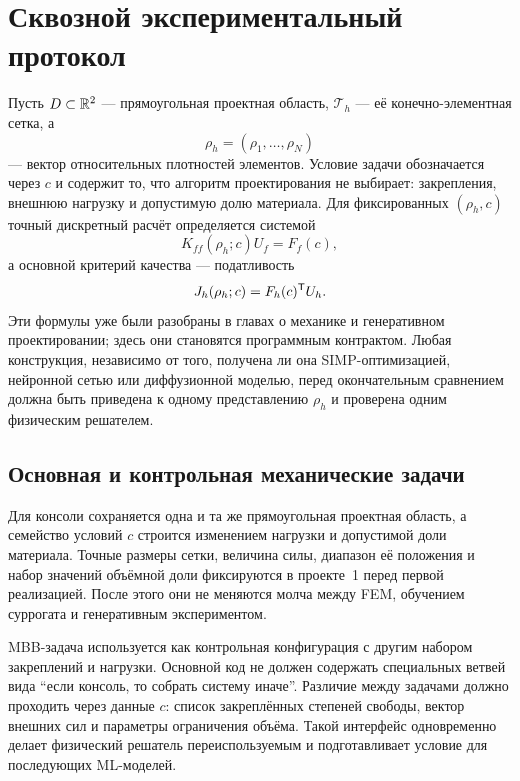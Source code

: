 \section{Сквозной экспериментальный протокол}
\label{sec:practical-experimental-protocol}

Пусть $D\subset\mathbb{R}^2$ --- прямоугольная проектная область, $\mathcal T_h$ --- её конечно-элементная сетка, а
\begin{equation}
 \rho_h=(\rho_1,\ldots,\rho_N)
\end{equation}
--- вектор относительных плотностей элементов. Условие задачи обозначается через $c$ и содержит то, что алгоритм проектирования не выбирает: закрепления, внешнюю нагрузку и допустимую долю материала. Для фиксированных $(\rho_h,c)$ точный дискретный расчёт определяется системой
\begin{equation}
\label{eq:practical-fem-state}
 K_{ff}(\rho_h;c)U_f=F_f(c),
\end{equation}
а основной критерий качества --- податливость
\begin{equation}
\label{eq:practical-compliance}
 J_h(\rho_h;c)
 =
 F_h(c)^{\mathsf{T}}U_h.
\end{equation}
Эти формулы уже были разобраны в главах о механике и генеративном проектировании; здесь они становятся программным контрактом. Любая конструкция, независимо от того, получена ли она SIMP-оптимизацией, нейронной сетью или диффузионной моделью, перед окончательным сравнением должна быть приведена к одному представлению $\rho_h$ и проверена одним физическим решателем.

\subsection{Основная и контрольная механические задачи}

Для консоли сохраняется одна и та же прямоугольная проектная область, а семейство условий $c$ строится изменением нагрузки и допустимой доли материала. Точные размеры сетки, величина силы, диапазон её положения и набор значений объёмной доли фиксируются в проекте~1 перед первой реализацией. После этого они не меняются молча между FEM, обучением суррогата и генеративным экспериментом.

MBB-задача используется как контрольная конфигурация с другим набором закреплений и нагрузки. Основной код не должен содержать специальных ветвей вида ``если консоль, то собрать систему иначе''. Различие между задачами должно проходить через данные $c$: список закреплённых степеней свободы, вектор внешних сил и параметры ограничения объёма. Такой интерфейс одновременно делает физический решатель переиспользуемым и подготавливает условие для последующих ML-моделей.

